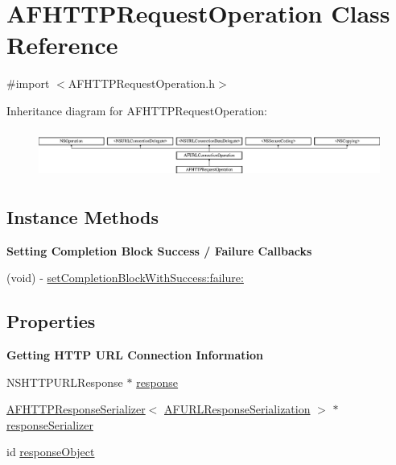 \hypertarget{interface_a_f_h_t_t_p_request_operation}{}\section{A\+F\+H\+T\+T\+P\+Request\+Operation Class Reference}
\label{interface_a_f_h_t_t_p_request_operation}


{\ttfamily \#import $<$A\+F\+H\+T\+T\+P\+Request\+Operation.\+h$>$}

Inheritance diagram for A\+F\+H\+T\+T\+P\+Request\+Operation\+:\begin{figure}[H]
\begin{center}
\leavevmode
\includegraphics[height=1.570093cm]{interface_a_f_h_t_t_p_request_operation}
\end{center}
\end{figure}
\subsection*{Instance Methods}
\begin{Indent}{\bf Setting Completion Block Success / Failure Callbacks}\par
{\em 

 

 }\begin{DoxyCompactItemize}
\item 
(void) -\/ \hyperlink{interface_a_f_h_t_t_p_request_operation_a8cb0d76aee08d4925c044f9bf1d015fb}{set\+Completion\+Block\+With\+Success\+:failure\+:}
\end{DoxyCompactItemize}
\end{Indent}
\subsection*{Properties}
\begin{Indent}{\bf Getting H\+T\+T\+P U\+R\+L Connection Information}\par
{\em 

 

 }\begin{DoxyCompactItemize}
\item 
N\+S\+H\+T\+T\+P\+U\+R\+L\+Response $\ast$ \hyperlink{interface_a_f_h_t_t_p_request_operation_a7a6e0248cffbdfa767d79e864fc1e730}{response}
\item 
\hyperlink{interface_a_f_h_t_t_p_response_serializer}{A\+F\+H\+T\+T\+P\+Response\+Serializer}$<$ \hyperlink{protocol_a_f_u_r_l_response_serialization-p}{A\+F\+U\+R\+L\+Response\+Serialization} $>$ $\ast$ \hyperlink{interface_a_f_h_t_t_p_request_operation_a1d59d01b3fff2796f06c35891dc01cea}{response\+Serializer}
\item 
id \hyperlink{interface_a_f_h_t_t_p_request_operation_a7418f7784dcaf21623ce588fb27734c3}{response\+Object}
\end{DoxyCompactItemize}
\end{Indent}
